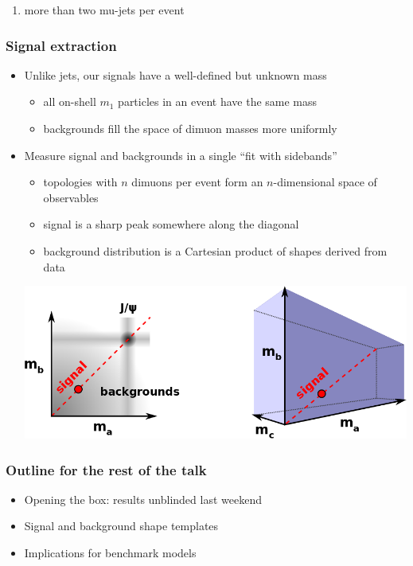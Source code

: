 \documentclass[compress]{beamer}
\begin{document}
\begin{frame}
\begin{center}
\begin{minipage}{0.8\linewidth}
\begin{enumerate}
\item \scriptsize more than two mu-jets per event
\end{enumerate}
\end{minipage}
\end{center}
\end{frame}

\begin{frame}
\frametitle{Signal extraction}

\begin{itemize}
\item Unlike jets, our signals have a well-defined but unknown mass
\begin{itemize}
\item all on-shell $m_1$ particles in an event have the same mass
\item backgrounds fill the space of dimuon masses more uniformly
\end{itemize}
\item Measure signal and backgrounds in a single ``fit with sidebands''
\begin{itemize}
\item topologies with $n$ dimuons per event form an $n$-dimensional
  space of observables
\item signal is a sharp peak somewhere along the diagonal
\item background distribution is a Cartesian product of shapes derived from data
\end{itemize}

\begin{center}
\includegraphics[width=0.9\linewidth]{diagonal.png}
\end{center}
\end{itemize}
\end{frame}

\begin{frame}
\frametitle{Outline for the rest of the talk}

\begin{itemize}\setlength{\itemsep}{0.75 cm}
\item Opening the box: results unblinded last weekend
\item Signal and background shape templates
\item Implications for benchmark models
\end{itemize}
\end{frame}
\end{document}
